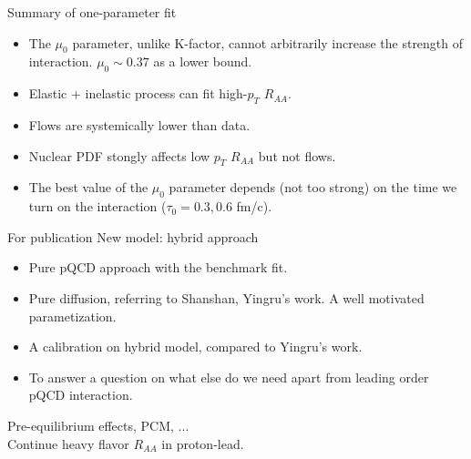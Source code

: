 \documentclass[11pt]{beamer}
\begin{document}
\begin{frame}{Summary of one-parameter fit}
\begin{itemize}
\item The $\mu_0$ parameter, unlike K-factor, cannot arbitrarily increase the strength of interaction. $\mu_0 \sim 0.37$ as a lower bound.
\item Elastic + inelastic process can fit high-$p_T$ $R_{AA}$.
\item Flows are systemically lower than data.
\item Nuclear PDF stongly affects low $p_T$ $R_{AA}$ but not flows.
\item The best value of the $\mu_0$ parameter depends (not too strong) on the time we turn on the interaction ($\tau_0=0.3, 0.6$ fm/c).
\end{itemize}

\end{frame}

\begin{frame}{For publication}
New model: hybrid approach
\begin{itemize}
\item Pure pQCD approach with the benchmark fit.
\item Pure diffusion, referring to Shanshan, Yingru's work. A well motivated parametization.
\item A calibration on hybrid model, compared to Yingru's work.
\item To answer a question on what else do we need apart from leading order pQCD interaction.
\end{itemize}

Pre-equilibrium effects, PCM, ... \\

Continue heavy flavor $R_{AA}$ in proton-lead.\\


\end{frame}
\end{document}
